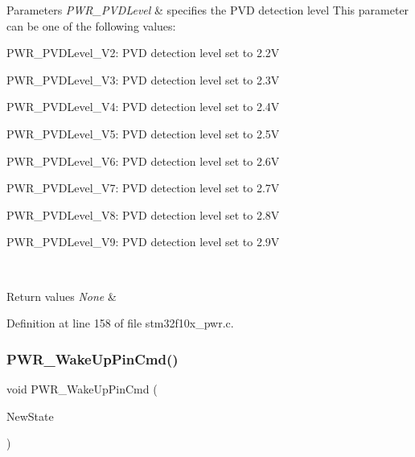 \begin{DoxyParams}{Parameters}
{\em P\+W\+R\+\_\+\+P\+V\+D\+Level} & specifies the P\+VD detection level This parameter can be one of the following values\+: \begin{DoxyItemize}
\item P\+W\+R\+\_\+\+P\+V\+D\+Level\+\_\+V2\+: P\+VD detection level set to 2.\+2V \item P\+W\+R\+\_\+\+P\+V\+D\+Level\+\_\+V3\+: P\+VD detection level set to 2.\+3V \item P\+W\+R\+\_\+\+P\+V\+D\+Level\+\_\+V4\+: P\+VD detection level set to 2.\+4V \item P\+W\+R\+\_\+\+P\+V\+D\+Level\+\_\+V5\+: P\+VD detection level set to 2.\+5V \item P\+W\+R\+\_\+\+P\+V\+D\+Level\+\_\+V6\+: P\+VD detection level set to 2.\+6V \item P\+W\+R\+\_\+\+P\+V\+D\+Level\+\_\+V7\+: P\+VD detection level set to 2.\+7V \item P\+W\+R\+\_\+\+P\+V\+D\+Level\+\_\+V8\+: P\+VD detection level set to 2.\+8V \item P\+W\+R\+\_\+\+P\+V\+D\+Level\+\_\+V9\+: P\+VD detection level set to 2.\+9V \end{DoxyItemize}
\\
\hline
\end{DoxyParams}

\begin{DoxyRetVals}{Return values}
{\em None} & \\
\hline
\end{DoxyRetVals}


Definition at line 158 of file stm32f10x\+\_\+pwr.\+c.

\mbox{\label{group___p_w_r___exported___functions_gae5fd6f9336ef8c60d5483651cb0d1a00}} 
\subsubsection{\texorpdfstring{P\+W\+R\+\_\+\+Wake\+Up\+Pin\+Cmd()}{PWR\_WakeUpPinCmd()}}
{\footnotesize\ttfamily void P\+W\+R\+\_\+\+Wake\+Up\+Pin\+Cmd (\begin{DoxyParamCaption}\item[{\hyperlink{group___exported__types_gac9a7e9a35d2513ec15c3b537aaa4fba1}{Functional\+State}}]{New\+State }\end{DoxyParamCaption})}



